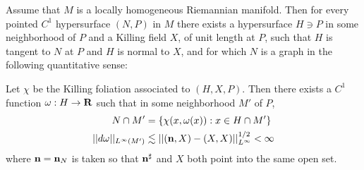 \begin{lemma}\label{hopfKilling}
Assume that $M$ is a locally homogeneous Riemannian manifold.
Then for every pointed $C^1$ hypersurface $(N, P)$ in $M$ there exists a hypersurface $H \ni P$ in some neighborhood of $P$ and a Killing field $X$, of unit length at $P$, such that $H$ is tangent to $N$ at $P$ and $H$ is normal to $X$, and for which $N$ is a graph in the following quantitative sense:

Let $\chi$ be the Killing foliation associated to $(H, X, P)$.
Then there exists a $C^1$ function $\omega: H \to \mathbf{R}$ such that in some neighborhood $M'$ of $P$,
\begin{align}
N \cap M' &= \{\chi(x, \omega(x)): x \in H \cap M'\} \label{N is a graph}\\
||d\omega||_{L^\infty(M')} &\lesssim ||(\mathbf n, X) - (X, X)||_{L^\infty}^{1/2} < \infty \label{derivative bounds}
\end{align}
where $\mathbf n = \mathbf n_N$ is taken so that $\mathbf n^\sharp$ and $X$ both point into the same open set.
\end{lemma}
